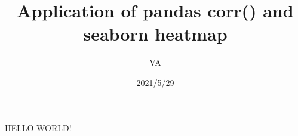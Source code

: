 \documentclass{article}
\title{Application of pandas corr() and seaborn heatmap}
\author{VA}
\date{2021/5/29}
\begin{document}
\maketitle
HELLO WORLD!
\end{document}

